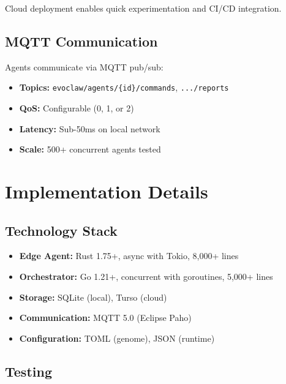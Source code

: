 \documentclass{article}
\begin{document}
Cloud deployment enables quick experimentation and CI/CD integration.

\subsection{MQTT Communication}

Agents communicate via MQTT pub/sub:

\begin{itemize}[leftmargin=*]
    \item \textbf{Topics:} \texttt{evoclaw/agents/\{id\}/commands}, \texttt{.../reports}
    \item \textbf{QoS:} Configurable (0, 1, or 2)
    \item \textbf{Latency:} Sub-50ms on local network
    \item \textbf{Scale:} 500+ concurrent agents tested
\end{itemize}



\section{Implementation Details}
\label{sec:implementation}

\subsection{Technology Stack}

\begin{itemize}[leftmargin=*]
    \item \textbf{Edge Agent:} Rust 1.75+, async with Tokio, 8,000+ lines
    \item \textbf{Orchestrator:} Go 1.21+, concurrent with goroutines, 5,000+ lines
    \item \textbf{Storage:} SQLite (local), Turso (cloud)
    \item \textbf{Communication:} MQTT 5.0 (Eclipse Paho)
    \item \textbf{Configuration:} TOML (genome), JSON (runtime)
\end{itemize}

\subsection{Testing}
\end{document}
